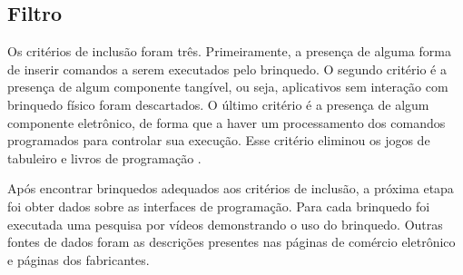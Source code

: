 \subsection{Filtro}
Os critérios de inclusão foram três. Primeiramente, a presença de alguma forma de inserir comandos a serem executados pelo brinquedo. O segundo critério é a presença de algum componente tangível, ou seja, aplicativos sem interação com brinquedo físico foram descartados. O último critério é a presença de algum componente eletrônico, de forma que a haver um processamento dos comandos programados para controlar sua execução. Esse critério eliminou os jogos de tabuleiro e livros de programação \cite{hamilton_emerging_2020}.

Após encontrar brinquedos adequados aos critérios de inclusão, a próxima etapa foi obter dados sobre as interfaces de programação. Para cada brinquedo foi executada uma pesquisa por vídeos demonstrando o uso do brinquedo. Outras fontes de dados foram as descrições presentes nas páginas de comércio eletrônico e páginas dos fabricantes. 

